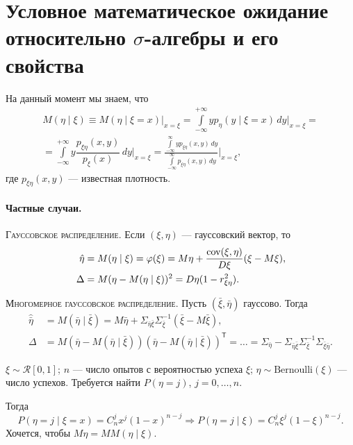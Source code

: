 \section{Условное математическое ожидание относительно $\sigma$-алгебры и его свойства}
На данный момент мы знаем, что 
\begin{multline*}
  M(\eta \mid \xi) \equiv M(\eta \mid \xi = x) \Big|_{x = \xi}
  = \int\limits_{-\infty}^{+\infty} y p_{\eta} (y \mid \xi = x) \, dy \bigg|_{x = \xi}
  = \\ =
  \int\limits_{-\infty}^{+\infty} y \dfrac{p_{\xi\eta} (x, y)}{p_\xi (x)} \,
  dy\biggl|_{x=\xi} = \frac{\int\limits_{-\infty}^{\infty}y p_{\xi\eta}(x,
  y)\,dy}{\int\limits_{-\infty}^{\infty}p_{\xi\eta}(x, y)\,dy}\Biggl|_{x=\xi},
\end{multline*}
где $p_{\xi\eta} (x, y)$ --- известная плотность.

\paragraph{Частные случаи.} \textsc{Гауссовское распределение.}
Если $(\xi, \eta)$ --- гауссовский вектор, то
\begin{align*}
  \hat{\eta} &= M(\eta \mid \xi) = \varphi(\xi) = M\eta + \dfrac{\operatorname{cov}(\xi,
  \eta)}{D\xi} (\xi-M\xi), \\
    \Delta &= M(\eta - M(\eta\mid\xi))^2 = D\eta (1 - r_{\xi\eta}^2).
\end{align*}

\textsc{Многомерное гауссовское распределение.}
Пусть $(\bar{\xi}, \bar{\eta})$ гауссово. Тогда
\begin{align*}
  \hat{\bar{\eta}} &= M(\bar{\eta} \mid \bar{\xi}) = M\bar{\eta} +
  \Sigma_{\bar{\eta} \bar{\xi}} \Sigma_{\bar{\xi}}^{-1} (\bar{\xi} -
  M\bar{\xi}), \\
  \Delta &= M(\bar{\eta} - M(\bar{\eta} \mid \bar{\xi}))(\bar{\eta} -
  M(\bar{\eta} \mid \bar{\xi}))^{\mathsf T}
  = \ldots = \Sigma_{\bar{\eta}} - \Sigma_{\bar{\eta}\bar{\xi}} \Sigma_{\bar{\xi}}^{-1} \Sigma_{\bar{\xi} \bar{\eta}}.
\end{align*}

\begin{ex}\label{ex-bernoulli-with-random-parameter}
  $\xi \sim \mathscr{R}[0, 1]$; $n$ --- число опытов с вероятностью успеха $\xi$; $\eta
  \sim \text{Bernoulli}(\xi)$ --- число успехов. Требуется найти $ P(\eta = j)
  $, $ j = 0, \ldots, n $.

  Тогда 
  \[
    P(\eta = j \mid \xi = x) = C_n^j x^j (1-x)^{n-j}
    \Rightarrow
    P(\eta = j \mid \xi) = C_n^j \xi^j (1-\xi)^{n-j}. 
  \]
  Хочется, чтобы $M\eta = MM(\eta \mid \xi)$.
\end{ex}

